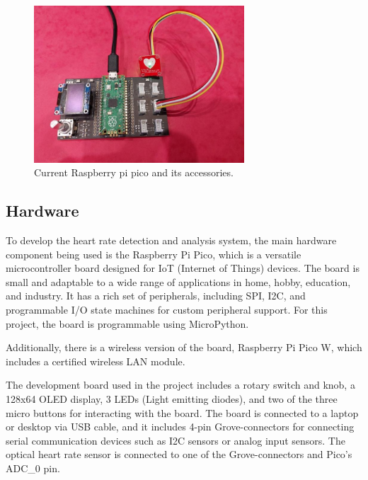 \documentclass{article}
\begin{document}
\begin{figure}[h]
  \centering
  \includegraphics[width=0.7\textwidth]{raspi_heart.png}
  \caption{ Current Raspberry pi pico and its accessories.}
  \label{raspi}
\end{figure}



\subsection{Hardware}

To develop the heart rate detection and analysis system, the main hardware component being used is the Raspberry Pi Pico, which is a versatile microcontroller board designed for IoT (Internet of Things) devices. The board is small and adaptable to a wide range of applications in home, hobby, education, and industry. It has a rich set of peripherals, including SPI, I2C, and programmable I/O state machines for custom peripheral support. For this project, the board is programmable using MicroPython.



Additionally, there is a wireless version of the board, Raspberry Pi Pico W, which includes a certified wireless LAN module.



The development board used in the project includes a rotary switch and knob, a 128x64 OLED display, 3 LEDs (Light emitting diodes), and two of the three micro buttons for interacting with the board. The board is connected to a laptop or desktop via USB cable, and it includes 4-pin Grove-connectors for connecting serial communication devices such as I2C sensors or analog input sensors. The optical heart rate sensor is connected to one of the Grove-connectors and Pico’s ADC\_0 pin.
\end{document}

